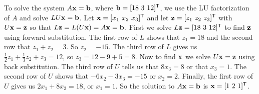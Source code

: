 \begin{example}
	\item  To solve the system $A \mathbf{x} = \mathbf{b}$, where $\mathbf{b} = [18 \ 3 \ 12]^{\mathsf{T}}$, we use the LU factorization of $A$ and solve $LU \mathbf{x} = \mathbf{b}$. Let $\mathbf{x} = [x_1 \ x_2 \ x_3]^{\mathsf{T}}$ and let $\mathbf{z} = [z_1 \ z_2 \ z_3]^{\mathsf{T}}$ with $U \mathbf{x} = \mathbf{z}$ so that $L \mathbf{z} = L(U\mathbf{x}) = A\mathbf{x} = \mathbf{b}$. First we solve $L \mathbf{z} = [18 \ 3 \ 12]^{\mathsf{T}}$ to find $\mathbf{z}$ using forward substitution. The first row of $L$ shows that $z_1 = 18$ and the second row that $z_1 + z_2 = 3$. So $z_2 = -15$. The third row of $L$ gives us $\frac{1}{2}z_1 + \frac{1}{3}z_2 + z_3 = 12$, so $z_3 = 12 - 9 + 5 = 8$. Now to find $\mathbf{x}$ we solve $U \mathbf{x} = \mathbf{z}$ using back substitution. The third row of $U$ tells us that $8x_3 = 8$ or that $x_3 = 1$. The second row of $U$ shows that $-6x_2-3x_3 = -15$ or $x_2 =2$. Finally, the first row of $U$ gives us $2x_1+8x_2 = 18$, or $x_1 = 1$. So the solution to $A \mathbf{x} = \mathbf{b}$ is $\mathbf{x} = [1 \ 2 \ 1]^{\mathsf{T}}$. 
	
	\ea

\end{example}


\label{sec:det_prop_summ}

